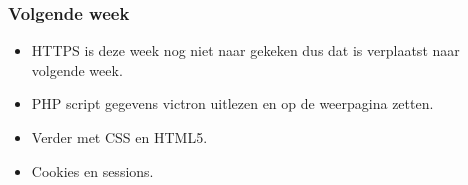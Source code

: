 \subsubsection*{Volgende week}
\begin{itemize}
\item
HTTPS is deze week nog niet naar gekeken dus dat is verplaatst naar volgende week.

\item
PHP script gegevens victron uitlezen en op de weerpagina zetten.

\item
Verder met CSS en HTML5.

\item
Cookies en sessions.

\end{itemize}
